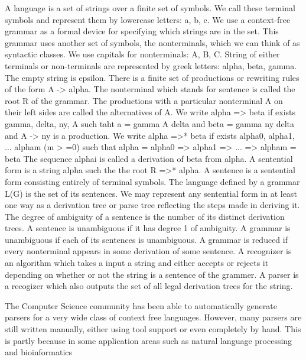 \begin{isabellebody}
\begin{isamarkuptext}
A language is a set of strings over a finite set of symbols. We call these terminal symbols and represent
them by lowercase letters: a, b, c. We use a context-free grammar as a formal device for specifying which
strings are in the set. This grammar uses another set of symbols, the nonterminals, which we can think of
as syntactic classes. We use capitals for nonterminals: A, B, C. String of either terminals or non-terminals
are represented by greek letters: alpha, beta, gamma. The empty string is epsilon. There is a finite set of
productions or rewriting rules of the form A -> alpha. The nonterminal which stands for sentence is called the
root R of the grammar. The productions with a particular nonterminal A on their left sides are called the
alternatives of A. We write alpha => beta if exists gamma, delta, ny, A such taht a = gamma A delta and
beta = gamma ny delta and A -> ny is a production. We write alpha =>* beta if exists alpha0, alpha1, ...
alpham (m > =0) such that alpha = alpha0 => alpha1 => ... => alpham = beta The sequence alphai is called a
derivation of beta from alpha. A sentential form is a string alpha such the the root R =>* alpha. A sentence
is a sentential form consisting entirely of terminal symbols. The language defined by a grammar L(G) is the
set of its sentences. We may represent any sentential form in at least one way as a derivation tree or parse
tree reflecting the steps made in deriving it. The degree of ambiguity of a sentence is the number of its
distinct derivation trees. A sentence is unambiguous if it has degree 1 of ambiguity. A grammar is unambiguous
if each of its sentences is unambiguous. A grammar is reduced if every nonterminal appears in some derivation
of some sentence. A recognizer is an algorithm which takes a input a string and either accepts or rejects it
depending on whether or not the string is a sentence of the grammer. A parser is a recogizer which also outputs
the set of all legal derivation trees for the string.%
\end{isamarkuptext}\isamarkuptrue%
%
\isadelimdocument
%
\endisadelimdocument
%
\isatagdocument
%
\isamarkuptrue%
%
\endisatagdocument
{\isafolddocument}%
%
\isadelimdocument
%
\endisadelimdocument
%
\begin{isamarkuptext}%
The Computer Science community has been able to automatically generate parsers for a very wide class of context
free languages. However, many parsers are still written manually, either using tool support or even completely
by hand. This is partly because in some application areas such as natural language processing and bioinformatics

\end{isamarkuptext}
\end{isabellebody}
